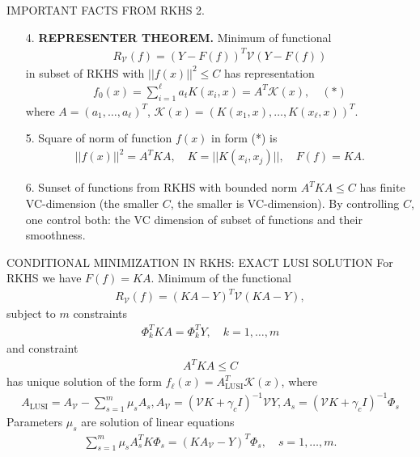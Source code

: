 \documentclass[11pt]{beamer}
\begin{document}
\begin{frame}{IMPORTANT FACTS FROM RKHS 2.}
\begin{enumerate}
\item[4.] \textbf{REPRESENTER THEOREM.} Minimum of functional
\begin{align*}
R_{\mathcal{V}}(f) = (Y - F(f))^{T}\mathcal{V}(Y - F(f))
\end{align*}
in subset of RKHS with $||f(x)||^{2} \leq C$ has representation
\begin{align*}
f_{0}(x) = \sum_{i=1}^{\ell}a_{t}K(x_{i}, x) = A^{T}\mathcal{K}(x), \quad (*)
\end{align*}
where $A = (a_{1}, \ldots, a_{\ell})^{T}$, $\mathcal{K}(x) = (K(x_{1}, x), \ldots, K(x_{\ell}, x))^{T}$.
\item[5.] Square of norm of function $f(x)$ in form (*) is
\begin{align*}
||f(x)||^{2} = A^{T}KA, \quad K = ||K(x_{i}, x_{j})||, \quad F(f) = KA.
\end{align*}
\item[6.] Sunset of functions from RKHS with bounded norm $A^{T}KA \leq C$ has finite VC-dimension (the smaller $C$, the smaller is VC-dimension). By controlling $C$, one control both: the VC dimension of subset of functions and their smoothness.

\end{enumerate}
\end{frame}

\begin{frame}{CONDITIONAL MINIMIZATION IN RKHS: EXACT LUSI SOLUTION}
For RKHS we have $F(f) = KA$. Minimum of the functional
\begin{align*}
R_{\mathcal{V}}(f) = (KA-Y)^{T}\mathcal{V}(KA-Y),
\end{align*}
subject to $m$ constraints
\begin{align*}
\Phi_{k}^{T}KA = \Phi_{k}^{T}Y, \quad k = 1, \ldots, m
\end{align*}
and constraint
\begin{align*}
A^{T}KA \leq C
\end{align*}
has unique solution of the form $f_{\ell}(x) = A_{\text{LUSI}}^{T}\mathcal{K}(x)$, where
\begin{align*}
A_{\text{LUSI}} = A_{\mathcal{V}} - \sum_{s=1}^{m}\mu_{s}A_{s},
A_{\mathcal{V}} = (\mathcal{V}K + \gamma_{c}I)^{-1}\mathcal{V}Y, A_{s} = (\mathcal{V}K + \gamma_{c}I)^{-1}\Phi_{s}
\end{align*}
Parameters $\mu_{s}$ are solution of linear equations
\begin{align*}
\sum_{s=1}^{m}\mu_{s}A_{s}^{T}K\Phi_{s} = (KA_{\mathcal{V}} - Y)^{T}\Phi_{s}, \quad s = 1,\ldots, m.
\end{align*}
\end{frame}
\end{document}
